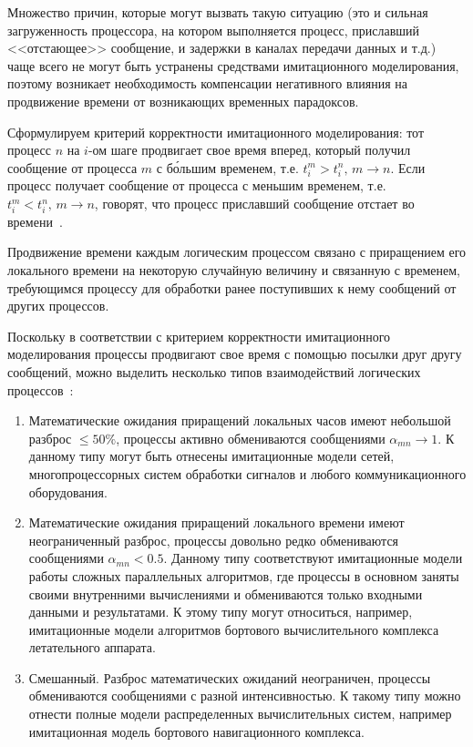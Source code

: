 Множество причин, которые могут вызвать такую ситуацию (это и сильная загруженность процессора, на котором выполняется процесс, приславший <<отстающее>> сообщение, и задержки в каналах передачи данных и т.д.) чаще всего не могут быть устранены средствами имитационного моделирования, поэтому возникает необходимость компенсации негативного влияния на продвижение времени от возникающих временных парадоксов.

Сформулируем критерий корректности имитационного моделирования: тот процесс $n$ на $i$-ом шаге продвигает свое время вперед, который получил сообщение от процесса $m$ с б\'ольшим временем, т.е. $t_i^m>t_i^n, \, m \to n$. Если процесс получает сообщение от процесса с меньшим временем, т.е. $t_i^m<t_i^n, \, m \to n$, говорят, что процесс приславший сообщение  отстает во времени~\cite{okol}.

Продвижение времени каждым логическим процессом связано с приращением его локального времени на некоторую случайную величину и связанную с временем, требующимся процессу для обработки ранее поступивших к нему сообщений от других процессов.

Поскольку в соответствии с критерием корректности имитационного моделирования процессы продвигают свое время с помощью посылки друг другу сообщений, можно выделить несколько типов взаимодействий логических процессов~\cite{voz-disser}:

\begin{enumerate}
  \item Математические ожидания приращений локальных часов имеют небольшой разброс $ \leqslant 50\%$, процессы активно обмениваются сообщениями $\alpha_{mn} \to 1$. К данному типу могут быть отнесены имитационные модели сетей, многопроцессорных систем обработки сигналов и любого коммуникационного оборудования.
  \item Математические ожидания приращений локального времени имеют неограниченный разброс, процессы довольно редко обмениваются сообщениями $\alpha_{mn} < 0.5$. Данному типу соответствуют имитационные модели работы сложных параллельных алгоритмов, где процессы в основном заняты своими внутренними вычислениями и обмениваются только входными данными и результатами. К этому типу могут относиться, например, имитационные модели алгоритмов бортового вычислительного комплекса летательного аппарата.
  \item Смешанный. Разброс математических ожиданий неограничен, процессы обмениваются сообщениями с разной интенсивностью. К такому типу можно отнести полные модели распределенных вычислительных систем, например имитационная модель бортового навигационного комплекса.
\end{enumerate}

